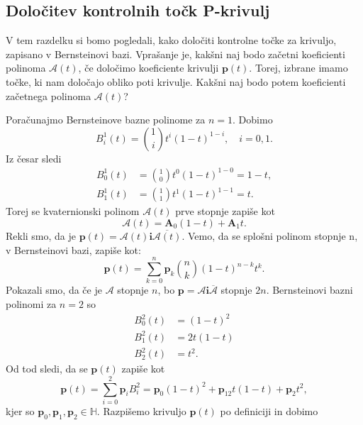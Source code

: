 \documentclass[mat1]{fmfdelo}
\newcommand{\HH}{\mathbb H}
\newcommand{\ii}{\boldsymbol i}
\newcommand{\pp}{\boldsymbol p}
\newcommand{\A}{\mathcal A}
\begin{document}
\subsection{Določitev kontrolnih točk P-krivulj}
V tem razdelku si bomo pogledali, kako določiti kontrolne točke za krivuljo, zapisano v Bernsteinovi bazi. Vprašanje je, kakšni naj bodo začetni koeficienti polinoma $\A(t)$, če določimo koeficiente krivulji $\pp(t)$. Torej, izbrane imamo točke, ki nam določajo obliko poti krivulje. Kakšni naj bodo potem koeficienti začetnega polinoma $\A(t)$?
\begin{primer}{\label{primer35}}Poračunajmo Bernsteinove bazne polinome za $n=1$. Dobimo
\begin{equation*}
B_i^1(t) = \binom{1}{i} t^i(1-t)^{1-i}, \quad i= 0,1.
\end{equation*}
Iz česar sledi
\begin{equation*}
	\begin{split}
	B_0^1(t) &= \binom{1}{0} t^0(1-t)^{1-0} = 1-t, \\
	B_1^1(t) &= \binom{1}{1} t^1(1-t)^{1-1} = t.
	\end{split}
\end{equation*}
Torej se kvaternionski polinom $\A(t)$ prve stopnje zapiše kot
\begin{equation*}
\A(t) = \boldsymbol{A}_0(1-t) + \boldsymbol{A}_1t.
\end{equation*} 
Rekli smo, da je $\pp(t) = \A(t) \ii \overline{\A(t)}$. Vemo, da se splošni polinom stopnje n, v Bernsteinovi bazi, zapiše kot:
\begin{equation*}
\pp(t) = \sum_{k=0}^n \pp_k \binom{n}{k}(1-t)^{n-k}t^k.
\end{equation*}
Pokazali smo, da če je $\A$ stopnje $n$, bo $\pp = \A\ii\overline{\A}$ stopnje $2n$. Bernsteinovi bazni polinomi za $n=2$ so
\begin{equation*}
\begin{split}
B_0^2(t)& = (1-t)^2\\
B_1^2(t) &= 2t(1-t)\\
B_2^2(t) &= t^2.
\end{split}
\end{equation*}
Od tod sledi, da se $\pp(t)$ zapiše kot
\begin{equation*}
	\pp(t) = \sum_{i=0}^2 \pp_i B_i^2 = \pp_0 (1-t)^2 + \pp_12t(1-t) + \pp_2t^2,
\end{equation*}
kjer so $\pp_0,\pp_1,\pp_2 \in \HH$.
Razpišemo krivuljo $\pp(t)$ po definiciji in dobimo
\begin{equation*}

\end{equation*}
\end{primer}
\end{document}
